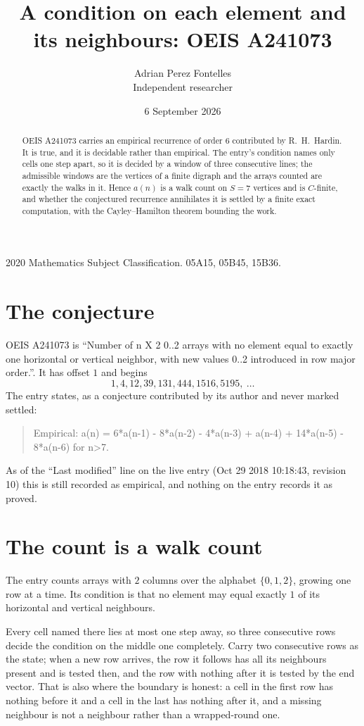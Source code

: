 \documentclass[11pt,a4paper]{article}
\title{A condition on each element and its neighbours: OEIS A241073}
\author{Adrian Perez Fontelles\\ \small Independent researcher}
\date{6 September 2026}
\theoremstyle{plain}
\theoremstyle{definition}
\begin{document}
\maketitle

\begin{abstract}
OEIS A241073 carries an empirical recurrence of order $6$ contributed by R.~H.~Hardin. It is
true, and it is decidable rather than empirical. The entry's condition names only cells one step apart, so it is decided by a window of
three consecutive lines; the
admissible windows are the vertices of a finite digraph and the arrays counted are exactly the
walks in it. Hence $a(n)$ is a walk count on $S=7$ vertices and is $C$-finite, and whether the
conjectured recurrence annihilates it is settled by a finite exact computation, with the
Cayley--Hamilton theorem bounding the work.
\end{abstract}

\noindent\small 2020 Mathematics Subject Classification. 05A15, 05B45, 15B36.\normalsize

\section{The conjecture}

OEIS A241073 is ``Number of n X 2 0..2 arrays with no element equal to exactly one horizontal or vertical neighbor, with new values 0..2 introduced in row major order.''. It has offset $1$ and begins
\[
1, 4, 12, 39, 131, 444, 1516, 5195,\ \dots
\]
The entry states, as a conjecture contributed by its author and never marked settled:
\begin{quote}
Empirical: a(n) = 6*a(n-1) - 8*a(n-2) - 4*a(n-3) + a(n-4) + 14*a(n-5) - 8*a(n-6) for n>7.
\end{quote}
As of the ``Last modified'' line on the live entry (Oct 29 2018 10:18:43, revision 10) this is still
recorded as empirical, and nothing on the entry records it as proved.

\section{The count is a walk count}

The entry counts arrays with $2$ columns over the alphabet $\{0,1,2\}$, growing one row at a time. Its condition is that no element may equal exactly $1$ of its horizontal and vertical neighbours.

Every cell named there lies at most one step away, so three consecutive rows decide the condition on the middle one completely. Carry two consecutive rows as the state; when a new row arrives, the row it follows has all its neighbours present and is tested then, and the row with nothing after it is tested by the end vector. That is also where the boundary is honest: a cell in the first row has nothing before it and a cell in the last has nothing after it, and a missing neighbour is not a neighbour rather than a wrapped-round one.
\end{document}
